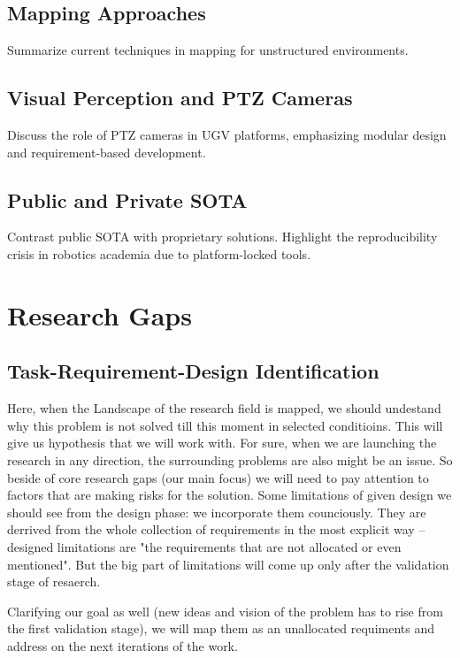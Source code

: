 \documentclass[runningheads]{llncs}
\begin{document}
\subsection{Mapping Approaches}
Summarize current techniques in mapping for unstructured environments.

\subsection{Visual Perception and PTZ Cameras}
Discuss the role of PTZ cameras in UGV platforms, emphasizing modular design and requirement-based development.

\subsection{Public and Private SOTA}
Contrast public SOTA with proprietary solutions. Highlight the reproducibility crisis in robotics academia due to platform-locked tools.

\section{Research Gaps}

\subsection{Task-Requirement-Design Identification}

Here, when the Landscape of the research field is mapped, we should undestand why this problem is not solved till this moment in selected conditioins.
This will give us hypothesis that we will work with.
For sure, when we are launching the research in any direction, the surrounding problems are also might be an issue. So beside of core research gaps (our main focus) we will need to pay attention to factors that are making risks for the solution.
Some limitations of given design we should see from the design phase: we incorporate them counciously. They are derrived from the whole collection of requirements in the most explicit way -- designed limitations are "the requirements that are not allocated or even mentioned". But the big part of limitations will come up only after the validation stage of resaerch.

Clarifying our goal as well (new ideas and vision of the problem has to rise from the first validation stage), we will map  them as an unallocated requiments and address on the next iterations of the work.
\end{document}
